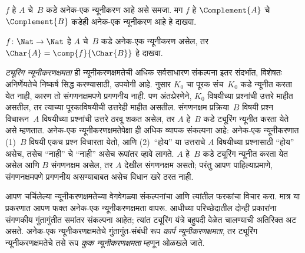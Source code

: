 \documentclass[../../../include/open-logic-section]{subfiles}
\begin{document}
\begin{prob}
$f$ हे $A$ चे~$B$ कडे अनेक-एक न्यूनीकरण आहे असे
समजा. मग $f$ हे $\Complement{A}$ चे $\Complement{B}$
कडेही अनेक-एक न्यूनीकरण आहे हे दाखवा.
\end{prob}

\begin{prob}
$f\colon \Nat \to \Nat$ हे $A$ चे~$B$ कडे अनेक-एक न्यूनीकरण असेल, तर
$\Char{A}
= \comp{f}{\Char{B}}$ हे दाखवा.
\end{prob}

\begin{digress}
\emph{ट्यूरिंग न्यूनीकरणक्षमता} ही न्यूनीकरणक्षमतेची अधिक
सर्वसाधारण संकल्पना इतर संदर्भांत, विशेषतः अनिर्णेयतेचे निष्कर्ष
सिद्ध करण्यासाठी, उपयोगी आहे.  नुसार
$K_0$ चा पूरक संच~$K_0$ कडे न्यूनीत करता येत नाही, कारण
तो संगणनक्षमपणे प्रगणनीय नाही. पण अंतःप्रेरणेने, $K_0$
विषयीच्या प्रश्नांची उत्तरे माहीत असतील, तर त्याच्या पूरकाविषयीची
उत्तरेही माहीत असतील. संगणनक्षम प्रक्रिया~$B$ विषयी प्रश्न
विचारून~$A$ विषयीच्या प्रश्नांची उत्तरे ठरवू शकत असेल, तर
$A$ हे~$B$ कडे ट्यूरिंग न्यूनीत करता येते असे म्हणतात.
अनेक-एक न्यूनीकरणक्षमतेपेक्षा ही अधिक व्यापक संकल्पना आहे:
अनेक-एक न्यूनीकरणात (1)~$B$ विषयी एकच प्रश्न विचारता येतो,
आणि (2)~``होय'' या उत्तराचे $A$ विषयीच्या प्रश्नासाठी
``होय'' असेच, तसेच ``नाही'' चे ``नाही'' असेच रूपांतर व्हावे
लागते. $A$ हे~$B$ कडे ट्यूरिंग न्यूनीत करता येत असेल
आणि $B$ संगणनक्षम असेल, तर $A$ देखील संगणनक्षम असतो;
परंतु आपण पाहिल्याप्रमाणे, संगणनक्षमपणे प्रगणनीय असण्याबाबत
असेच विधान खरे ठरत नाही.

आपण चर्चिलेल्या न्यूनीकरणक्षमतेच्या वेगवेगळ्या संकल्पनांचा
आणि त्यांतील फरकांचा विचार करा. मात्र या प्रकरणात आपण फक्त
अनेक-एक न्यूनीकरणक्षमता वापरू. आधीच्या परिच्छेदातील दोन्ही
प्रकारांना संगणकीय गुंतागुंतीत समांतर संकल्पना आहेत; त्यांत
ट्यूरिंग यंत्रे बहुपदी वेळेत चालण्याची अतिरिक्त अट असते.
अनेक-एक न्यूनीकरणक्षमतेचे गुंतागुंत-संबंधी रूप
\emph{कार्प न्यूनीकरणक्षमता}, तर ट्यूरिंग न्यूनीकरणक्षमतेचे
तसे रूप \emph{कुक न्यूनीकरणक्षमता} म्हणून ओळखले जाते.
\end{digress}
\end{document}
